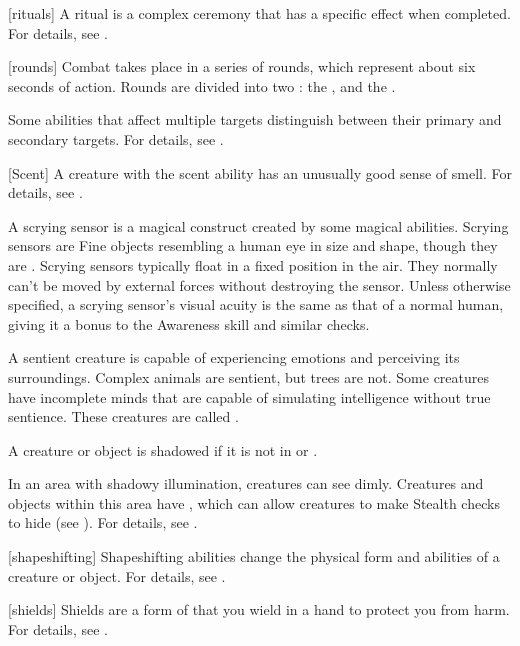 [rituals] A ritual is a complex \magical ceremony that has a specific effect when completed.
For details, see .

[rounds] Combat takes place in a series of rounds, which represent about six seconds of action.
Rounds are divided into two : the , and the .

 Some abilities that affect multiple targets distinguish between their primary and secondary targets.
For details, see .

[Scent] A creature with the scent ability has an unusually good sense of smell.
For details, see .

 A scrying sensor is a magical construct created by some magical abilities.
Scrying sensors are Fine objects resembling a human eye in size and shape, though they are .
Scrying sensors typically float in a fixed position in the air.
They normally can't be moved by external forces without destroying the sensor.
Unless otherwise specified, a scrying sensor's visual acuity is the same as that of a normal human, giving it a  bonus to the Awareness skill and similar checks.

 A sentient creature is capable of experiencing emotions and perceiving its surroundings.
Complex animals are sentient, but trees are not.
Some creatures have incomplete minds that are capable of simulating intelligence without true sentience.
These creatures are called .

 A creature or object is shadowed if it is not in  or .

 In an area with shadowy illumination, creatures can see dimly.
Creatures and objects within this area have , which can allow creatures to make Stealth checks to hide (see ).
For details, see .

[shapeshifting] Shapeshifting abilities change the physical form and abilities of a creature or object.
For details, see .

[shields] Shields are a form of  that you wield in a hand to protect you from harm.
For details, see .

